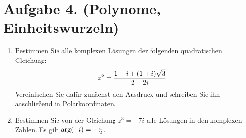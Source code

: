 \documentclass[german,12pt]{homework}
\DeclarePairedDelimiter{\enbrace}{(}{)}
\begin{document}
    \section*{Aufgabe 4. (Polynome, Einheitswurzeln)}

    \begin{problem}
        \begin{enumerate}
            \item Bestimmen Sie alle komplexen Lösungen der folgenden quadratischen Gleichung:
            \[z^2 = \frac{1 - i + \enbrace*{1 + i}\sqrt{3}}{2 - 2i}\]
            Vereinfachen Sie dafür zunächst den Ausdruck und schreiben Sie ihn anschließend in Polarkoordinaten.
            \item Bestimmen Sie von der Gleichung \(z^3 = -7i\) alle Lösungen in den komplexen Zahlen. Es gilt \(\arg\enbrace*{-i} = -\frac{\pi}{2}\).
        \end{enumerate}
    \end{problem}
\end{document}

